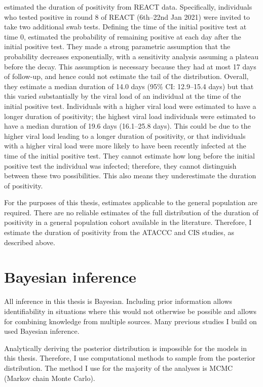 \documentclass[thesis.tex]{subfiles}
\begin{document}
\Textcite{ealesCharacterising} estimated the duration of positivity from REACT data.
Specifically, individuals who tested positive in round 8 of REACT (6th--22nd Jan 2021) were invited to take two additional swab tests.
Defining the time of the initial positive test at time 0, \textcite{ealesCharacterising} estimated the probability of remaining positive at each day after the initial positive test.
They made a strong parametric assumption that the probability decreases exponentially, with a sensitivity analysis assuming a plateau before the decay.
This assumption is necessary because they had at most 17 days of follow-up, and hence could not estimate the tail of the distribution.
Overall, they estimate a median duration of 14.0 days (95\% CI: 12.9--15.4 days) but that this varied substantially by the viral load of an individual at the time of the initial positive test.
Individuals with a higher viral load were estimated to have a longer duration of positivity; the highest viral load individuals were estimated to have a median duration of 19.6 days (16.1--25.8 days).
This could be due to the higher viral load leading to a longer duration of positivity, or that individuals with a higher viral load were more likely to have been recently infected at the time of the initial positive test.
They cannot estimate how long before the initial positive test the individual was infected; therefore, they cannot distinguish between these two possibilities.
This also means they underestimate the duration of positivity.

For the purposes of this thesis, estimates applicable to the general population are required.
There are no reliable estimates of the full distribution of the duration of positivity in a general population cohort available in the literature.
Therefore, I estimate the duration of positivity from the ATACCC and CIS studies, as described above.

\section{Bayesian inference} \label{intro:sec:Bayes}

All inference in this thesis is Bayesian.
Including prior information allows identifiability in situations where this would not otherwise be possible and allows for combining knowledge from multiple sources.
Many previous studies I build on used Bayesian inference.

Analytically deriving the posterior distribution is impossible for the models in this thesis.
Therefore, I use computational methods to sample from the posterior distribution.
The method I use for the majority of the analyses is MCMC (Markov chain Monte Carlo).
\end{document}
